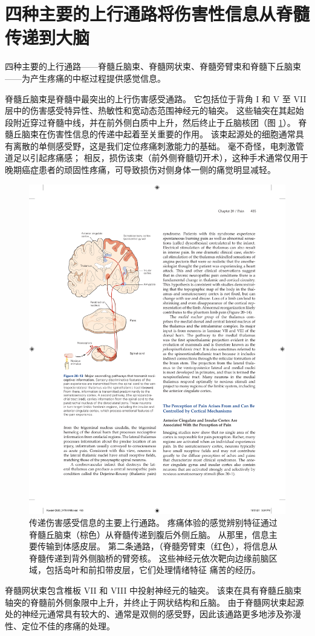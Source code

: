 \section{四种主要的上行通路将伤害性信息从脊髓传递到大脑}
四种主要的上行通路——脊髓丘脑束、脊髓网状束、脊髓旁臂束和脊髓下丘脑束——为产生疼痛的中枢过程提供感觉信息。

脊髓丘脑束是脊髓中最突出的上行伤害感受通路。 
它包括位于背角 I 和 V 至 VII 层中的伤害感受特异性、热敏性和宽动态范围神经元的轴突。 
这些轴突在其起始段附近穿过脊髓中线，并在前外侧白质中上升，然后终止于丘脑核团（图 \ref{fig:20_13}）。 
脊髓丘脑束在伤害性信息的传递中起着至关重要的作用。 
该束起源处的细胞通常具有离散的单侧感受野，这是我们定位疼痛刺激能力的基础。 
毫不奇怪，电刺激管道足以引起疼痛感； 相反，损伤该束（前外侧脊髓切开术），这种手术通常仅用于晚期癌症患者的顽固性疼痛，可导致损伤对侧身体一侧的痛觉明显减轻。


\begin{figure}[htbp]
	\centering
	\includegraphics[width=0.7\linewidth]{chap20/fig_20_13}
	\caption{传递伤害感受信息的主要上行通路。 
		疼痛体验的感觉辨别特征通过脊髓丘脑束（棕色）从脊髓传递到腹后外侧丘脑。 
		从那里，信息主要传输到体感皮层。 
		第二条通路，（脊髓旁臂束（红色），将信息从脊髓传递到背外侧脑桥的臂旁核。
		这些神经元依次靶向边缘前脑区域，包括岛叶和前扣带皮层，它们处理情绪特征 痛苦的经历。}
	\label{fig:20_13}
\end{figure}


脊髓网状束包含椎板 VII 和 VIII 中投射神经元的轴突。 
该束在具有脊髓丘脑束轴突的脊髓前外侧象限中上升，并终止于网状结构和丘脑。 
由于脊髓网状束起源处的神经元通常具有较大的、通常是双侧的感受野，因此该通路更多地涉及弥漫性、定位不佳的疼痛的处理。


